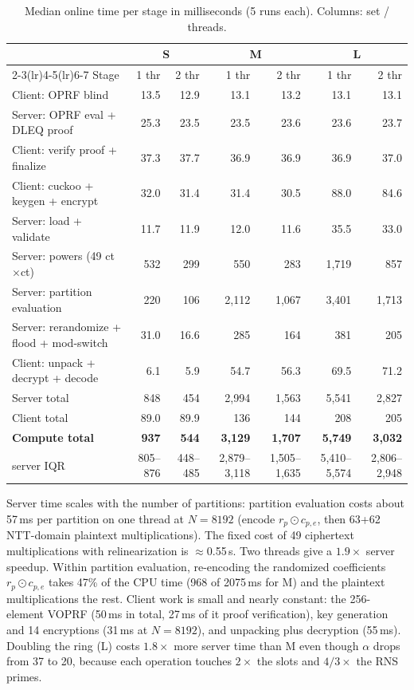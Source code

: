 \documentclass[11pt]{article}
\begin{document}
\begin{table}[H]
\centering\small
\caption{Median online time per stage in milliseconds (5 runs each). Columns: set / threads.}
\label{tab:time}
\setlength{\tabcolsep}{4.5pt}\footnotesize
\begin{tabular}{@{}lrrrrrr@{}}
\toprule
 & \multicolumn{2}{c}{S} & \multicolumn{2}{c}{M} & \multicolumn{2}{c}{L} \\
\cmidrule(lr){2-3}\cmidrule(lr){4-5}\cmidrule(lr){6-7}
Stage & 1 thr & 2 thr & 1 thr & 2 thr & 1 thr & 2 thr \\
\midrule
Client: OPRF blind & 13.5 & 12.9 & 13.1 & 13.2 & 13.1 & 13.1 \\
Server: OPRF eval + DLEQ proof & 25.3 & 23.5 & 23.5 & 23.6 & 23.6 & 23.7 \\
Client: verify proof + finalize & 37.3 & 37.7 & 36.9 & 36.9 & 36.9 & 37.0 \\
Client: cuckoo + keygen + encrypt & 32.0 & 31.4 & 31.4 & 30.5 & 88.0 & 84.6 \\
Server: load + validate & 11.7 & 11.9 & 12.0 & 11.6 & 35.5 & 33.0 \\
Server: powers (49 ct$\times$ct) & 532 & 299 & 550 & 283 & 1,719 & 857 \\
Server: partition evaluation & 220 & 106 & 2,112 & 1,067 & 3,401 & 1,713 \\
Server: rerandomize + flood + mod-switch & 31.0 & 16.6 & 285 & 164 & 381 & 205 \\
Client: unpack + decrypt + decode & 6.1 & 5.9 & 54.7 & 56.3 & 69.5 & 71.2 \\
\midrule
Server total & 848 & 454 & 2,994 & 1,563 & 5,541 & 2,827 \\
Client total & 89.0 & 89.9 & 136 & 144 & 208 & 205 \\
\textbf{Compute total} & \textbf{937} & \textbf{544} & \textbf{3,129} & \textbf{1,707} & \textbf{5,749} & \textbf{3,032} \\
\quad server IQR & 805--876 & 448--485 & 2,879--3,118 & 1,505--1,635 & 5,410--5,574 & 2,806--2,948 \\
\bottomrule
\end{tabular}
\end{table}
Server time scales with the number of partitions: partition evaluation costs about 57\,ms per partition on one thread at $N=8192$ (encode $r_p\odot c_{p,e}$, then 63+62 NTT-domain plaintext multiplications). The fixed cost of 49 ciphertext multiplications with relinearization is $\approx$0.55\,s. Two threads give a $1.9\times$ server speedup. Within partition evaluation, re-encoding the randomized coefficients $r_p\odot c_{p,e}$ takes 47\% of the CPU time (968 of 2075\,ms for M) and the plaintext multiplications the rest. Client work is small and nearly constant: the 256-element VOPRF (50\,ms in total, 27\,ms of it proof verification), key generation and 14 encryptions (31\,ms at $N=8192$), and unpacking plus decryption (55\,ms). Doubling the ring (L) costs $1.8\times$ more server time than M even though $\alpha$ drops from 37 to 20, because each operation touches $2\times$ the slots and $4/3\times$ the RNS primes.
\end{document}
